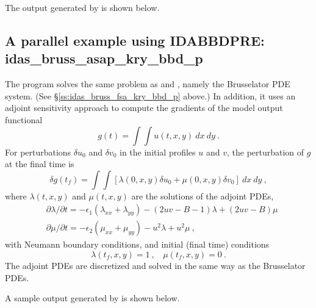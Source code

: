 The output generated by  is shown below.




\subsection{A parallel example using IDABBDPRE: idas\_bruss\_asap\_kry\_bbd\_p}
\label{ss:idas_bruss_asap_kry_bbd_p}

The  program solves the same problem as
 and , namely the
Brusselator PDE system.  (See \S\ref{ss:idas_bruss_fsa_kry_bbd_p} above.)
In addition, it uses an adjoint sensitivity approach to compute the
gradients of the model output functional
\begin{equation*}
  g(t) = \int \int u(t,x,y)~dx~dy ~.
\end{equation*}
For perturbations $\delta u_0$ and $\delta v_0$ in the initial profiles
$u$ and $v$, the perturbation of $g$ at the final time is
\begin{equation*}
  \delta g(t_f) = \int \int [\lambda(0,x,y) \delta u_0 + \mu(0,x,y) \delta v_0] ~dx~dy ~,
\end{equation*}
where $\lambda(t,x,y)$ and $\mu(t,x,y)$ are the solutions of the adjoint PDEs,
\begin{equation*}
\begin{split}
  &\partial \lambda / \partial t = -\epsilon_1 (\lambda_{xx} + \lambda_{yy})
                              - (2 u v - B - 1) \lambda + (2 u v - B) \mu \\
  &\partial \mu / \partial t = -\epsilon_2 (\mu_{xx} + \mu_{yy})
                              - u^2 \lambda + u^2 \mu ~,
\end{split}
\end{equation*}
with Neumann boundary conditions, and initial (final time) conditions
\begin{equation*}
  \lambda (t_f,x,y) = 1 ~, ~~~~ \mu (t_f,x,y) =  0 ~.
\end{equation*}
The adjoint PDEs are discretized and solved in the same way as the
Brusselator PDEs.

A sample output generated by  is shown below.

